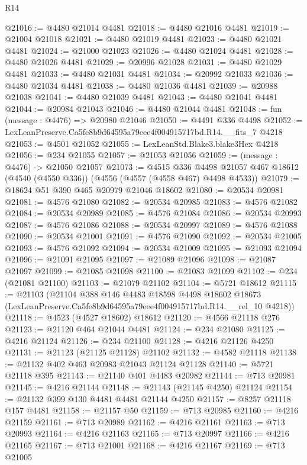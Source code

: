 \begin{lexlean}{R14}
\begin{coremodule}
@21016 := @4480 @21014 @4481
@21018 := @4480 @21016 @4481
@21019 := @21004 @21018
@21021 := @4480 @21019 @4481
@21023 := @4480 @21021 @4481
@21024 := @21000 @21023
@21026 := @4480 @21024 @4481
@21028 := @4480 @21026 @4481
@21029 := @20996 @21028
@21031 := @4480 @21029 @4481
@21033 := @4480 @21031 @4481
@21034 := @20992 @21033
@21036 := @4480 @21034 @4481
@21038 := @4480 @21036 @4481
@21039 := @20988 @21038
@21041 := @4480 @21039 @4481
@21043 := @4480 @21041 @4481
@21044 := @20984 @21043
@21046 := @4480 @21044 @4481
@21048 := fun (message : @4476) => @20980 @21046
@21050 := @4491 @336 @4498
@21052 := LexLeanPreserve.Ca5fe8b9d64595a79eee4f004915717bd.R14.__fits_7 @4218
@21053 := @4501 @21052
@21055 := LexLeanStd.Blake3.blake3Hex @4218
@21056 := @234 @21055
@21057 := @21053 @21056
@21059 := (message : @4476) -> @21050 @21057
@21073 := @4515
    @336
    @4498
    @21057
    @467
    @18612
    (@4540 (@4550 @336))
    (@4556 (@4557 (@4558 @467) @4498 @4533))
@21079 := @18624 @51 @390 @465 @20979 @21046 @18602
@21080 := @20534 @20981
@21081 := @4576 @21080
@21082 := @20534 @20985
@21083 := @4576 @21082
@21084 := @20534 @20989
@21085 := @4576 @21084
@21086 := @20534 @20993
@21087 := @4576 @21086
@21088 := @20534 @20997
@21089 := @4576 @21088
@21090 := @20534 @21001
@21091 := @4576 @21090
@21092 := @20534 @21005
@21093 := @4576 @21092
@21094 := @20534 @21009
@21095 := @21093 @21094
@21096 := @21091 @21095
@21097 := @21089 @21096
@21098 := @21087 @21097
@21099 := @21085 @21098
@21100 := @21083 @21099
@21102 := @234 (@21081 @21100)
@21103 := @21079 @21102
@21104 := @5721 @18612
@21115 := @21103
    (@21104
      @388
      @146
      @4483
      @18598
      @4498
      @18602
      @18673
      (LexLeanPreserve.Ca5fe8b9d64595a79eee4f004915717bd.R14.__rel_10 @4218))
@21118 := @4523 (@4527 @18602) @18612
@21120 := @4566 @21118 @276
@21123 := @21120 @464 @21044 @4481
@21124 := @234 @21080
@21125 := @4216 @21124
@21126 := @234 @21100
@21128 := @4216 @21126 @4250
@21131 := @21123 (@21125 @21128) @21102
@21132 := @4582 @21118
@21138 := @21132 @402 @463 @20983 @21043 @21124 @21128
@21140 := @5721 @21118 @395
@21143 := @21140 @401 @4483 @20982
@21144 := @713 @20981
@21145 := @4216 @21144
@21148 := @21143 (@21145 @4250) @21124
@21154 := @21132 @399 @130 @4481 @4481 @21144 @4250
@21157 := @8257 @21118 @157 @4481
@21158 := @21157 @50
@21159 := @713 @20985
@21160 := @4216 @21159
@21161 := @713 @20989
@21162 := @4216 @21161
@21163 := @713 @20993
@21164 := @4216 @21163
@21165 := @713 @20997
@21166 := @4216 @21165
@21167 := @713 @21001
@21168 := @4216 @21167
@21169 := @713 @21005

\end{coremodule}
\end{lexlean}
